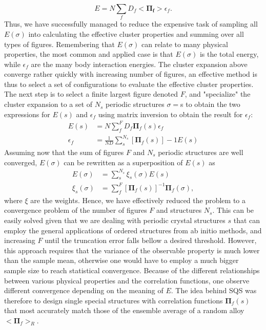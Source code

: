 \begin{equation}
    E = N\sum_f D_f<\boldsymbol{\Pi_f}>\epsilon_f.
\end{equation}
Thus, we have successfully managed to reduce the expensive task of sampling all $E(\sigma)$ into calculating the effective cluster properties and summing over all types of figures. Remembering that $E(\sigma)$ can relate to many physical properties, the most common and applied case is that $E(\sigma)$ is the total energy, while $\epsilon_f$ are the many body interaction energies. The cluster expansion above converge rather quickly with increasing number of figures, an effective method is thus to select a set of configurations to evaluate the effective cluster properties. The next step is to select a finite largest figure denoted $F$, and "specialize" the cluster expansion to a set of $N_s$ periodic structures ${\sigma} = ${s} to obtain the two expressions for $E(s)$ and $\epsilon_f$ using matrix inversion to obtain the result for $\epsilon_f$:
\begin{align}
E(s) &= N\sum_{f}^{F} D_f \boldsymbol{\Pi}_f (s)\epsilon_f \\     
\epsilon_f &= \frac{1}{ND}\sum_{s}^{N_s}[\boldsymbol{\Pi}_f (s)]-1E(s)
\end{align}
Assuming now that the sum of figures $F$ and $N_s$ periodic structures are well converged, $E(\sigma)$ can be rewritten as a superposition of $E(s)$ as
\begin{align}
    E(\sigma) &= \sum_{s}^{N_s}\xi_s(\sigma)E(s) \\
    \xi_s(\sigma) &= \sum_{f}^{F}[\boldsymbol{\Pi}_f(s)]^{-1}\boldsymbol{\Pi}_f(\sigma),   
\end{align}
where $\xi$ are the weights. Hence, we have effectively reduced the problem to a convergence problem of the number of figures $F$ and structures $N_s$. This can be easily solved given that we are dealing with periodic crystal structures ${s}$ that can employ the general applications of ordered structures from ab initio methods, and increasing $F$ until the truncation error falls bellow a desired threshold. However, this approach requires that the variance of the observable property is much lower than the sample mean, otherwise one would have to employ a much bigger sample size to reach statistical convergence. Because of the different relationships between various physical properties and the correlation functions, one observe different convergence depending on the meaning of $E$. The idea behind SQS was therefore to design single special structures with correlation functions ${\boldsymbol{\Pi}_f(s)}$ that most accurately match those of the ensemble average of a random alloy $<\boldsymbol{\Pi}_f>_R$. 

